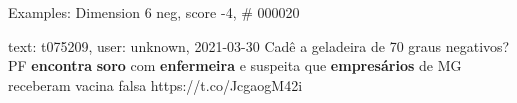 \begin{frame}{Examples: Dimension 6 neg, score -4, \# 000020}
\footnotesize
\begin{alertblock}{text: t075209, user: unknown, 2021-03-30}
Cadê a geladeira de 70 graus negativos? PF \textbf{encontra} \textbf{soro} com 
\textbf{enfermeira} e suspeita que \textbf{empresários} de MG receberam vacina 
falsa https://t.co/JcgaogM42i 
\end{alertblock}
\end{frame}
